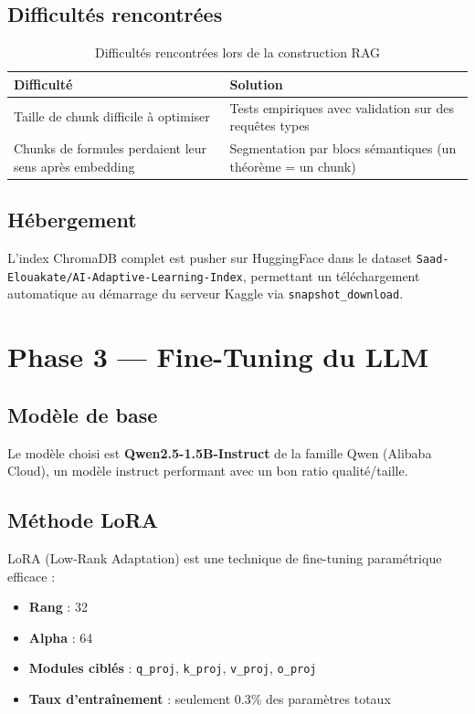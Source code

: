 \documentclass[12pt,a4paper]{report}
\begin{document}
\subsection{Difficultés rencontrées}
\begin{table}[h!]
    \centering
    \begin{tabular}{p{6cm} p{8cm}}
        \toprule
        \textbf{Difficulté} & \textbf{Solution} \\
        \midrule
        Taille de chunk difficile à optimiser & Tests empiriques avec validation sur des requêtes types \\
        Chunks de formules perdaient leur sens après embedding & Segmentation par blocs sémantiques (un théorème = un chunk) \\
        \bottomrule
    \end{tabular}
    \caption{Difficultés rencontrées lors de la construction RAG}
\end{table}

\subsection{Hébergement}
L'index ChromaDB complet est pusher sur HuggingFace dans le dataset \texttt{Saad-Elouakate/AI-Adaptive-Learning-Index}, permettant un téléchargement automatique au démarrage du serveur Kaggle via \texttt{snapshot\_download}.

\section{Phase 3 — Fine-Tuning du LLM}

\subsection{Modèle de base}
Le modèle choisi est \textbf{Qwen2.5-1.5B-Instruct} de la famille Qwen (Alibaba Cloud), un modèle instruct performant avec un bon ratio qualité/taille.

\subsection{Méthode LoRA}
LoRA (Low-Rank Adaptation) est une technique de fine-tuning paramétrique efficace :
\begin{itemize}
    \item \textbf{Rang} : 32
    \item \textbf{Alpha} : 64
    \item \textbf{Modules ciblés} : \texttt{q\_proj}, \texttt{k\_proj}, \texttt{v\_proj}, \texttt{o\_proj}
    \item \textbf{Taux d'entraînement} : seulement 0.3\% des paramètres totaux
\end{itemize}
\end{document}
